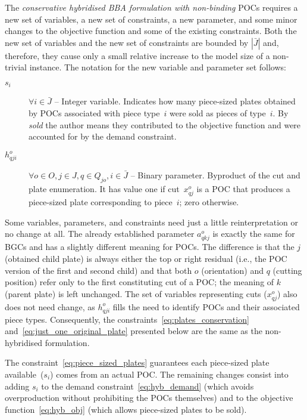 \documentclass[ppgc,tese,english,formais,babel]{iiufrgs}
\begin{document}
The \emph{conservative hybridised BBA formulation with non-binding} POCs requires a new set of variables, a new set of constraints, a new parameter, and some minor changes to the objective function and some of the existing constraints.
Both the new set of variables and the new set of constraints are bounded by \(|\bar{J}|\) and, therefore, they cause only a small relative increase to the model size of a non-trivial instance.
The notation for the new variable and parameter set follows:

\begin{description}
\item [\(s_i\)] \(\forall i \in \bar{J}\) -- Integer variable. Indicates how many piece-sized plates obtained by POCs associated with piece type~\(i\) were sold as pieces of type~\(i\). By \emph{sold} the author means they contributed to the objective function and were accounted for by the demand constraint.
\item [\(h^o_{qji}\)] \(\forall o \in O, j \in J, q \in Q_{jo}, i \in \bar{J}\) -- Binary parameter. Byproduct of the cut and plate enumeration. It has value one if cut~\(x^o_{qj}\) is a POC that produces a piece-sized plate corresponding to piece~\(i\); zero otherwise.%
\end{description}

Some variables, parameters, and constraints need just a little reinterpretation or no change at all.
The already established parameter \(a^o_{qkj}\) is exactly the same for BGCs and has a slightly different meaning for POCs.
The difference is that the \(j\) (obtained child plate) is always either the top or right residual (i.e., the POC version of the first and second child) and that both \(o\) (orientation) and \(q\) (cutting position) refer only to the first constituting cut of a POC; the meaning of \(k\) (parent plate) is left unchanged.
The set of variables representing cuts (\(x^o_{qj}\)) also does not need change, as \(h^o_{qji}\) fills the need to identify POCs and their associated piece types. Consequently, the constraints~\eqref{eq:plates_conservation} and~\eqref{eq:just_one_original_plate} presented below are the same as the non-hybridised formulation.

The constraint~\eqref{eq:piece_sized_plates} guarantees each piece-sized plate available~(\(s_i\)) comes from an actual POC.
The remaining changes consist into adding \(s_i\) to the demand constraint~\eqref{eq:hyb_demand} (which avoids overproduction without prohibiting the POCs themselves) and to the objective function~\eqref{eq:hyb_obj} (which allows piece-sized plates to be sold).
\end{document}
